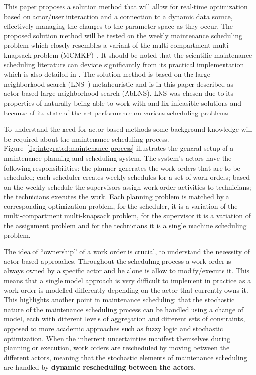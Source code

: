 This paper proposes a solution method that will allow for real-time
optimization based on actor/user interaction and a connection to a dynamic
data source, effectively managing the changes to the parameter space as
they occur. The proposed solution method will be tested on the weekly
maintenance scheduling problem \citep{palmerMaintenancePlanningScheduling2019}
which closely resembles a variant of the multi-compartment multi-knapsack
problem (MCMKP)~\citep{do2007constrained}. It should be noted that the
scientific maintenance scheduling literature can deviate significantly
from its practical implementation which is also detailed in
\citep{palmerMaintenancePlanningScheduling2019}. The solution method is based
on the large neighborhood search (LNS~\citep{shaw1998using}) metaheuristic and
is in this paper described as actor-based large neighborhood search (AbLNS). LNS
was chosen due to its properties of naturally being able to work with and fix
infeasible solutions and because of its state of the art performance on various
scheduling problems \citep{gendreauHandbookMetaheuristics2019}.

To understand the need for actor-based methods some
background knowledge will be required about the maintenance scheduling process.
Figure~\ref{fig:integrated:maintenance-process} illustrates the general setup
of a maintenance planning and scheduling system. The system's actors
have the following responsibilities: the planner generates the work orders that
are to be scheduled; each scheduler creates weekly schedules for a set of work orders; 
based on the weekly schedule the supervisors assign work order
activities to technicians; the
technicians executes the work. Each planning problem is matched 
by a corresponding optimization problem, for the scheduler, it is a variation of the
multi-compartment multi-knapsack problem, for the supervisor it is a variation of the 
assignment problem and for the technicians it is a single machine scheduling problem.

The idea of ``ownership'' of a work order is crucial, to understand the necessity of
actor-based approaches. Throughout the scheduling process a
work order is always owned by a specific actor and he alone is allow to modify/execute it. This
means that a single model approach is very difficult to implement in practice
as a work order is modelled differently depending on the actor that currently
owns it. This highlights another point in maintenance scheduling: that
the stochastic nature of the maintenance scheduling process can be handled using
a change of model, each with different levels of aggregation and different sets
of constraints, opposed to more academic approaches such as fuzzy logic and
stochastic optimization. When the inherrent uncertainties manifest themselves
during planning or execution, work orders are rescheduled by moving between
the different actors, meaning that the stochastic elements of maintenance
scheduling are handled by \textbf{dynamic rescheduling between the actors}.


